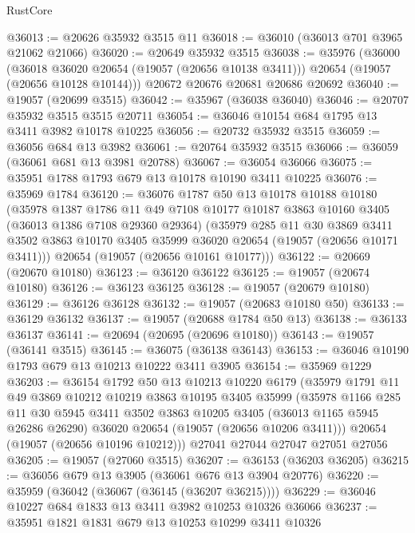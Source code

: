\begin{lexlean}{RustCore}
\begin{coremodule}
@36013 := @20626 @35932 @3515 @11
@36018 := @36010 (@36013 @701 @3965 @21062 @21066)
@36020 := @20649 @35932 @3515
@36038 := @35976
    (@36000
      (@36018 @36020 @20654 (@19057 (@20656 @10138 @3411)))
      @20654
      (@19057 (@20656 @10128 @10144)))
    @20672
    @20676
    @20681
    @20686
    @20692
@36040 := @19057 (@20699 @3515)
@36042 := @35967 (@36038 @36040)
@36046 := @20707 @35932 @3515 @3515 @20711
@36054 := @36046 @10154 @684 @1795 @13 @3411 @3982 @10178 @10225
@36056 := @20732 @35932 @3515
@36059 := @36056 @684 @13 @3982
@36061 := @20764 @35932 @3515
@36066 := @36059 (@36061 @681 @13 @3981 @20788)
@36067 := @36054 @36066
@36075 := @35951 @1788 @1793 @679 @13 @10178 @10190 @3411 @10225
@36076 := @35969 @1784
@36120 := @36076
    @1787
    @50
    @13
    @10178
    @10188
    @10180
    (@35978
      @1387
      @1786
      @11
      @49
      @7108
      @10177
      @10187
      @3863
      @10160
      @3405
      (@36013 @1386 @7108 @29360 @29364)
      (@35979
        @285
        @11
        @30
        @3869
        @3411
        @3502
        @3863
        @10170
        @3405
        @35999
        @36020
        @20654
        (@19057 (@20656 @10171 @3411)))
      @20654
      (@19057 (@20656 @10161 @10177)))
@36122 := @20669 (@20670 @10180)
@36123 := @36120 @36122
@36125 := @19057 (@20674 @10180)
@36126 := @36123 @36125
@36128 := @19057 (@20679 @10180)
@36129 := @36126 @36128
@36132 := @19057 (@20683 @10180 @50)
@36133 := @36129 @36132
@36137 := @19057 (@20688 @1784 @50 @13)
@36138 := @36133 @36137
@36141 := @20694 (@20695 (@20696 @10180))
@36143 := @19057 (@36141 @3515)
@36145 := @36075 (@36138 @36143)
@36153 := @36046 @10190 @1793 @679 @13 @10213 @10222 @3411 @3905
@36154 := @35969 @1229
@36203 := @36154
    @1792
    @50
    @13
    @10213
    @10220
    @6179
    (@35979
      @1791
      @11
      @49
      @3869
      @10212
      @10219
      @3863
      @10195
      @3405
      @35999
      (@35978
        @1166
        @285
        @11
        @30
        @5945
        @3411
        @3502
        @3863
        @10205
        @3405
        (@36013 @1165 @5945 @26286 @26290)
        @36020
        @20654
        (@19057 (@20656 @10206 @3411)))
      @20654
      (@19057 (@20656 @10196 @10212)))
    @27041
    @27044
    @27047
    @27051
    @27056
@36205 := @19057 (@27060 @3515)
@36207 := @36153 (@36203 @36205)
@36215 := @36056 @679 @13 @3905 (@36061 @676 @13 @3904 @20776)
@36220 := @35959 (@36042 (@36067 (@36145 (@36207 @36215))))
@36229 := @36046 @10227 @684 @1833 @13 @3411 @3982 @10253 @10326 @36066
@36237 := @35951 @1821 @1831 @679 @13 @10253 @10299 @3411 @10326

\end{coremodule}
\end{lexlean}
